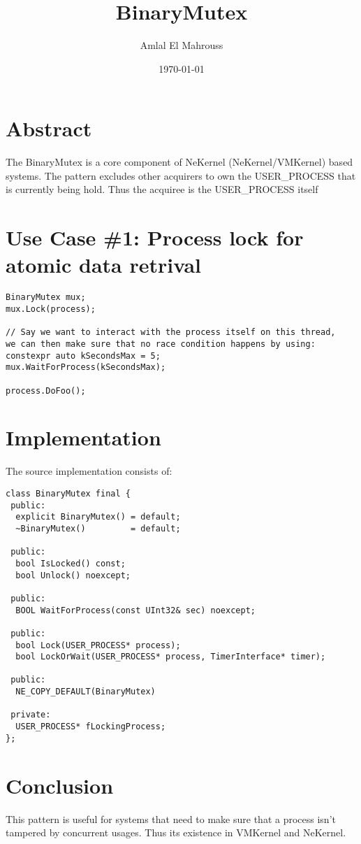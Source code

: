 \documentclass{article}
\title{BinaryMutex}
\author{Amlal El Mahrouss}
\date{\today}
\begin{document}
\maketitle

\section{Abstract}

{The BinaryMutex is a core component of NeKernel (NeKernel/VMKernel) based systems. The pattern excludes other acquirers to own the USER\_PROCESS that is currently being hold. Thus the acquiree is the USER\_PROCESS itself}

\section{Use Case \#1: Process lock for atomic data retrival}

\begin{verbatim}
BinaryMutex mux;
mux.Lock(process);

// Say we want to interact with the process itself on this thread, 
we can then make sure that no race condition happens by using:
constexpr auto kSecondsMax = 5;
mux.WaitForProcess(kSecondsMax);

process.DoFoo();
\end{verbatim}

\section{Implementation}

The source implementation consists of:

\begin{verbatim}
class BinaryMutex final {
 public:
  explicit BinaryMutex() = default;
  ~BinaryMutex()         = default;

 public:
  bool IsLocked() const;
  bool Unlock() noexcept;

 public:
  BOOL WaitForProcess(const UInt32& sec) noexcept;

 public:
  bool Lock(USER_PROCESS* process);
  bool LockOrWait(USER_PROCESS* process, TimerInterface* timer);

 public:
  NE_COPY_DEFAULT(BinaryMutex)

 private:
  USER_PROCESS* fLockingProcess;
};
\end{verbatim}

\section{Conclusion}

This pattern is useful for systems that need to make sure that a process isn't tampered by concurrent usages. Thus its existence in VMKernel and NeKernel.
\end{document}
